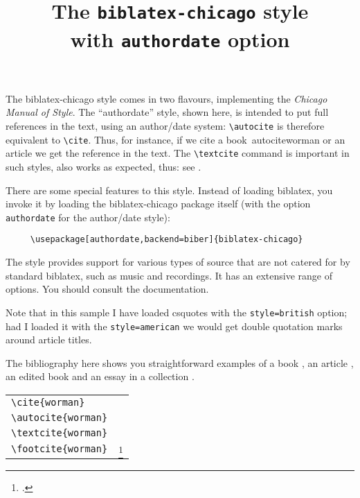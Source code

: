 \documentclass[varwidth=\textwidth,class=article,border=5pt]{standalone}
\begin{document}
\title{The \texttt{biblatex-chicago} style\\with \texttt{authordate} option}
\author{}\date{}
\maketitle

The \textsf{biblatex-chicago} style comes in two flavours, implementing the \emph{Chicago Manual of Style}. The \enquote{authordate} style, shown here, is intended to put full references in the text, using an author/date system: \verb|\autocite| is therefore equivalent to \verb|\cite|. Thus, for instance, if we cite a book\ autocite{worman} or an article \autocite{reese} we get the reference in the text. The \verb|\textcite| command is important in such styles, also works as expected, thus: see \textcite{worman}.

\quad There are some special features to this style. Instead of loading \textsf{biblatex}, you invoke it by loading the \textsf{biblatex-chicago} package itself (with the option \verb|authordate| for the author/date style):
\begin{verbatim}
     \usepackage[authordate,backend=biber]{biblatex-chicago}
\end{verbatim}
The style provides support for various types of source that are not catered for by standard \textsf{biblatex}, such as music and recordings. It has an extensive range of options. You should consult the documentation.

\quad Note that in this sample I have loaded \textsf{csquotes} with the \verb~style=british~ option; had I loaded it with the \verb~style=american~ we would get double quotation marks around article titles.

\quad The bibliography here shows you straightforward examples of a book \autocite{worman}, an article \autocite{reese}, an edited book \autocite{aristotle:anima} and an essay in a collection \autocite{gaonkar:in}.

\medskip

\begin{tabular}{ll}
\verb|\cite{worman}| & \cite{worman} \\
\verb|\autocite{worman}| & \autocite{worman} \\
\verb|\textcite{worman}| & \textcite{worman} \\
\verb|\footcite{worman}| & \strut\footcite{worman}
\end{tabular}

\printbibliography
\end{document}
